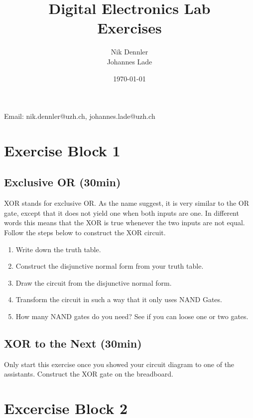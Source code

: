 \documentclass[10pt,a4paper]{article}
\author{Nik Dennler \\ Johannes Lade}
\title{Digital Electronics Lab\\ \textbf{Exercises}}
\date{\today{}}
\begin{document}
	
\begin{titlepage}
	\maketitle
		\begin{center}
			Email: nik.dennler@uzh.ch, johannes.lade@uzh.ch
		\end{center}
	\thispagestyle{empty}
\end{titlepage}




\section{Exercise Block 1}
\label{sec:exercise-block-1}

\subsection{Exclusive OR (30min)}\label{subsec:ex-1}

XOR stands for exclusive OR. As the name suggest, it is very similar to the OR gate, except that it does not yield one when both inputs are one. In different words this means that the XOR is true whenever the two inputs are not equal. Follow the steps below to construct the XOR circuit.
\begin{enumerate}
	\item Write down the truth table.
	\item\label{it:1} Construct the disjunctive normal form from your truth table.
	\item Draw the circuit from the disjunctive normal form.
	\item Transform the circuit in such a way that it only uses NAND Gates.
	\item How many NAND gates do you need? See if you can loose one or two gates.
\end{enumerate}

\subsection{XOR to the Next (30min)}
Only start this exercise once you showed your circuit diagram to one of the assistants.
Construct the XOR gate on the breadboard.

\section{Excercise Block 2}
\end{document}
